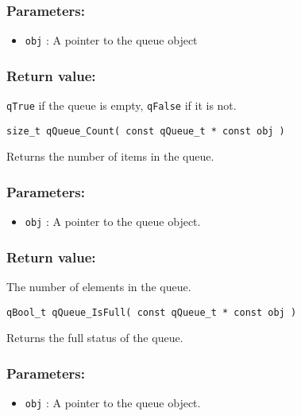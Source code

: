 \subsubsection*{Parameters:}
\begin{itemize}
    \item \lstinline{obj} : A pointer to the queue object
\end{itemize}

\subsubsection*{Return value:}
\lstinline{qTrue} if the queue is empty, \lstinline{qFalse} if it is not.

\noindent\hrulefill


\begin{lstlisting}[style=CStyle]
size_t qQueue_Count( const qQueue_t * const obj )
\end{lstlisting}

Returns the number of items in the queue. 

\subsubsection*{Parameters:}
\begin{itemize}
    \item \lstinline{obj} : A pointer to the queue object.
\end{itemize}

\subsubsection*{Return value:}
The number of elements in the queue.

\noindent\hrulefill


\begin{lstlisting}[style=CStyle]
qBool_t qQueue_IsFull( const qQueue_t * const obj )
\end{lstlisting}

Returns the full status of the queue. 

\subsubsection*{Parameters:}
\begin{itemize}
    \item \lstinline{obj} : A pointer to the queue object.
\end{itemize}

